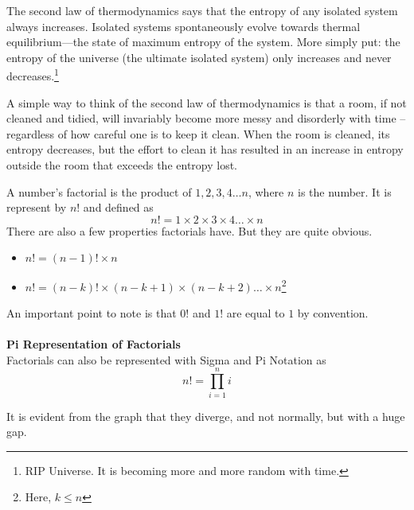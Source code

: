 \begin{chembox}{}
    {The second law of thermodynamics says that the entropy of any isolated system always increases. Isolated systems spontaneously evolve towards thermal equilibrium—the state of maximum entropy of the system. More simply put: the entropy of the universe (the ultimate isolated system) only increases and never decreases.\footnote{RIP Universe. It is becoming more and more random with time.}

    A simple way to think of the second law of thermodynamics is that a room, if not cleaned and tidied, will invariably become more messy and disorderly with time – regardless of how careful one is to keep it clean. When the room is cleaned, its entropy decreases, but the effort to clean it has resulted in an increase in entropy outside the room that exceeds the entropy lost.}
\end{chembox}
\begin{mathbox}{}
{A number's factorial is the product of $1,2,3,4 \dots n$, where $n$ is the number. It is represent by $n!$ and defined as $$n! = 1 \times 2 \times 3 \times 4 \dots \times n$$
There are also a few properties factorials have. But they are quite obvious.
\begin{itemize}
    \item{$n! = (n-1)! \times n$}
    \item{$n! = (n-k)! \times (n-k+1) \times (n-k+2) \dots \times n$\footnote{Here, $k \leq n$}}
\end{itemize}
An important point to note is that $0!$ and $1!$ are equal to $1$ by convention.\\\\
\textbf{Pi Representation of Factorials}\\
Factorials can also be represented with Sigma and Pi Notation as
$$\displaystyle n! = \prod_{i=1} ^n i$$
\begin{center}
\end{center}
It is evident from the graph that they diverge, and not normally, but with a huge gap.}
\end{mathbox}
